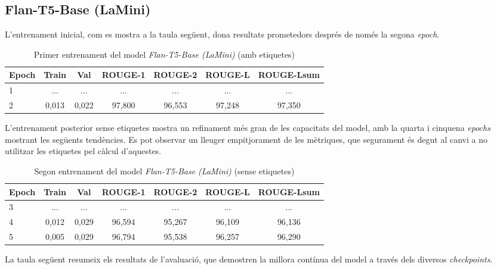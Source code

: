 \subsection{Flan-T5-Base (LaMini)}
L'entrenament inicial, com es mostra a la taula següent, dona resultats prometedors després de només la segona \textit{epoch}.
\begin{table}[H]
    \centering
    \begin{tabular}{lcccccc}
    \toprule
    Epoch & Train & Val & ROUGE-1 & ROUGE-2 & ROUGE-L & ROUGE-Lsum \\
    \midrule
    1 & ...   & ...   & ...    & ...    & ...    & ... \\
    2 & 0,013 & 0,022 & 97,800 & 96,553 & 97,248 & 97,350 \\
    \bottomrule
    \end{tabular}
    \caption[Primer entrenament del model \textit{Flan-T5-Base (LaMini)}]{Primer entrenament del model \textit{Flan-T5-Base (LaMini)} (amb etiquetes)}
\end{table}

L'entrenament posterior sense etiquetes mostra un refinament més gran de les capacitats del model, amb la quarta i cinquena \textit{epochs} mostrant les següents tendències. Es pot observar un lleuger empitjorament de les mètriques, que segurament és degut al canvi a no utilitzar les etiquetes pel càlcul d'aquestes.

\begin{table}[H]
    \centering
    \begin{tabular}{lcccccc}
    \toprule
    Epoch & Train & Val & ROUGE-1 & ROUGE-2 & ROUGE-L & ROUGE-Lsum \\
    \midrule
    3 & ...  & ...    & ...    & ...    & ...    & ... \\
    4 & 0,012 & 0,029 & 96,594 & 95,267 & 96,109 & 96,136 \\
    5 & 0,005 & 0,029 & 96,794 & 95,538 & 96,257 & 96,290 \\
    \bottomrule
    \end{tabular}
    \caption[Segon entrenament del model \textit{Flan-T5-Base (LaMini)}]{Segon entrenament del model \textit{Flan-T5-Base (LaMini)} (sense etiquetes)}
\end{table}

La taula següent resumeix els resultats de l'avaluació, que demostren la millora contínua del model a través dels diversos \textit{checkpoints}.

